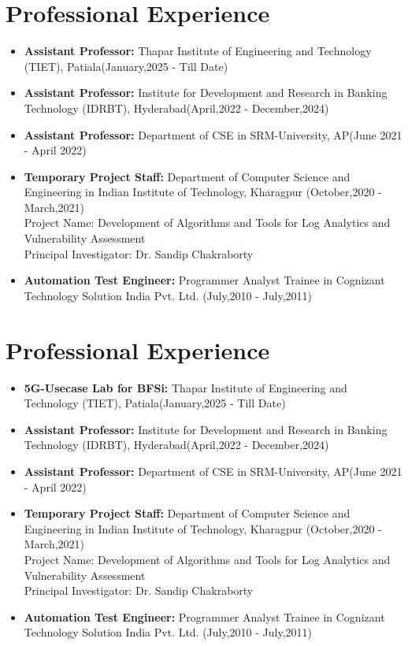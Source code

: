 \documentclass{article}
\begin{document}
\section{Professional Experience}
	\begin{itemize}
		\item{\bf Assistant Professor:} Thapar Institute of Engineering and Technology (TIET), Patiala(January,2025 - Till Date)
		\item{\bf Assistant Professor:} Institute for Development and Research in Banking Technology (IDRBT), Hyderabad(April,2022 - December,2024)
		\item{\bf Assistant Professor:} Department of CSE in SRM-University, AP(June 2021 - April 2022)
		\item{\bf Temporary Project Staff:} Department of Computer Science and Engineering in Indian Institute of Technology, Kharagpur (October,2020 - March,2021)\\
	Project Name: Development of Algorithms and Tools for Log Analytics  and Vulnerability Assessment \\
	Principal Investigator: Dr. Sandip Chakraborty
		\item{\bf Automation Test Engineer:} Programmer Analyst Trainee in Cognizant Technology Solution India Pvt. Ltd. (July,2010 - July,2011)
	\end{itemize}
\section{Professional Experience}
	\begin{itemize}
		\item{\bf 5G-Usecase Lab for BFSi:} Thapar Institute of Engineering and Technology (TIET), Patiala(January,2025 - Till Date)
		\item{\bf Assistant Professor:} Institute for Development and Research in Banking Technology (IDRBT), Hyderabad(April,2022 - December,2024)
		\item{\bf Assistant Professor:} Department of CSE in SRM-University, AP(June 2021 - April 2022)
		\item{\bf Temporary Project Staff:} Department of Computer Science and Engineering in Indian Institute of Technology, Kharagpur (October,2020 - March,2021)\\
	Project Name: Development of Algorithms and Tools for Log Analytics  and Vulnerability Assessment \\
	Principal Investigator: Dr. Sandip Chakraborty
		\item{\bf Automation Test Engineer:} Programmer Analyst Trainee in Cognizant Technology Solution India Pvt. Ltd. (July,2010 - July,2011)
	\end{itemize}
\end{document}
